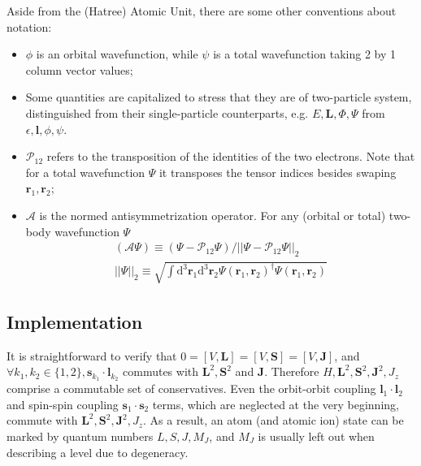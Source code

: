 \documentclass{article}
\renewcommand{\d}{\mathrm{d}}
\begin{document}
Aside from the (Hatree) Atomic Unit, there are some other conventions about notation:
\begin{itemize}
\item $\phi$ is an orbital wavefunction, while $\psi$ is a total wavefunction taking 2 by 1 column vector values;
\item Some quantities are capitalized to stress that they are of two-particle system, distinguished from their single-particle counterparts, e.g. $E,\bm{L},\Phi, \Psi$ from $\epsilon,\bm{l},\phi,\psi$.
\item $\mathcal P_{12}$ refers to the transposition of the identities of the two electrons. Note that for a total wavefunction $\Psi$ it transposes the tensor indices besides swaping $\bm{r}_1,\bm{r}_2$;
\item $\mathcal A$ is the normed antisymmetrization operator. For any (orbital or total) two-body wavefunction $\Psi$
\begin{gather}
\left(\mathcal{A}\Psi\right) \equiv (\Psi - \mathcal P_{12}\Psi)/||\Psi - \mathcal P_{12}\Psi||_2\label{eq:defA}\\
||\Psi||_2 \equiv \sqrt{\int\d^3\bm{r}_1\d^3\bm{r}_2\Psi(\bm{r}_1,\bm{r}_2)^\dagger\Psi(\bm{r}_1,\bm{r}_2)}
\end{gather}
\end{itemize}

\subsection{Implementation}

It is straightforward to verify that $0=[V, \bm{L}]=[V, \bm{S}]=[V,\bm{J}] $, and $\forall k_1,k_2\in\{1,2\}, \bm{s}_{k_1}\cdot\bm{l}_{k_2}$ commutes with $\bm{L}^2,\bm{S}^2$ and $\bm{J}$. Therefore $H, \bm{L}^2, \bm{S}^2, \bm{J}^2, J_z$ comprise a commutable set of conservatives. Even the orbit-orbit coupling $\bm{l}_1\cdot\bm{l}_2$ and spin-spin coupling $\bm{s}_1\cdot\bm{s}_2$ terms, which are neglected at the very beginning, commute with $\bm{L}^2, \bm{S}^2, \bm{J}^2, J_z$. As a result, an atom (and atomic ion) state can be marked by quantum numbers $L,S,J,M_J$, and $M_J$ is usually left out when describing a level due to degeneracy. 
\end{document}
